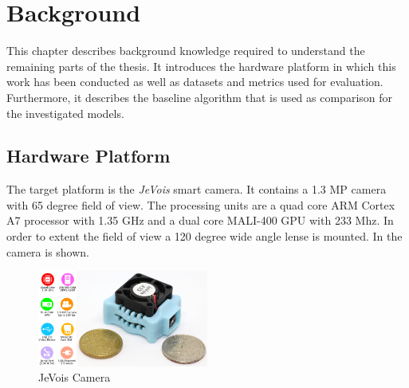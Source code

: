 \chapter{Background}
\label{sec:metrics}

This chapter describes background knowledge required to understand the remaining parts of the thesis. It introduces the hardware platform in which this work has been conducted as well as datasets and metrics used for evaluation. Furthermore, it describes the baseline algorithm that is used as comparison for the investigated models.

\section{Hardware Platform}

The target platform is the \textit{JeVois} smart camera. It contains a 1.3 MP camera with 65 degree field of view. The processing units are a quad core ARM Cortex A7 processor with 1.35 GHz and a dual core MALI-400 GPU with 233 Mhz. In order to extent the field of view a 120 degree wide angle lense is mounted. In  the camera is shown.

\begin{figure}[hbtp]
	\centering
	\includegraphics[width=0.5\textwidth]{fig/jevois}
	\caption{JeVois Camera}
	\label{fig:jevois}
\end{figure}


